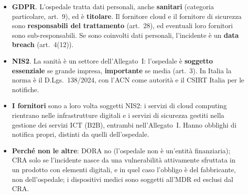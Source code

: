 \begin{soluzione}
\begin{itemize}
  \item \textbf{GDPR}. L'ospedale tratta dati personali, anche \textbf{sanitari} (categoria
    particolare, art.~9), ed è \textbf{titolare}. Il fornitore cloud e il fornitore di sicurezza sono
    \textbf{responsabili del trattamento} (art.~28), ed eventuali loro fornitori sono sub-responsabili.
    Se sono coinvolti dati personali, l'incidente è un \textbf{data breach} (art.~4(12)).
  \item \textbf{NIS2}. La sanità è un settore dell'Allegato~I: l'ospedale è \textbf{soggetto
    essenziale} se grande impresa, \textbf{importante} se media (art.~3). In Italia la norma è il
    D.Lgs.~138/2024, con l'ACN come autorità e il CSIRT Italia per le notifiche.
  \item \textbf{I fornitori} sono a loro volta soggetti NIS2: i servizi di cloud computing rientrano
    nelle infrastrutture digitali e i servizi di sicurezza gestiti nella gestione dei servizi ICT
    (B2B), entrambi nell'Allegato~I. Hanno obblighi di notifica propri, distinti da quelli
    dell'ospedale.
  \item \textbf{Perché non le altre}: DORA no (l'ospedale non è un'entità finanziaria); CRA solo se
    l'incidente nasce da una vulnerabilità attivamente sfruttata in un prodotto con elementi digitali,
    e in quel caso l'obbligo è del fabbricante, non dell'ospedale; i dispositivi medici sono soggetti
    all'MDR ed esclusi dal CRA.
\end{itemize}
\end{soluzione}

